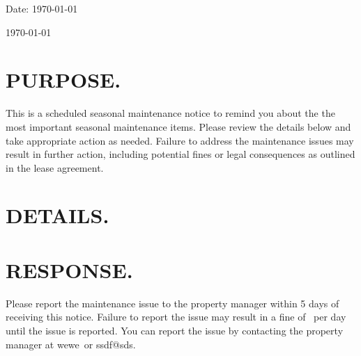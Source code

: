 \documentclass[9pt]{article}
\makeatletter
\renewcommand{\ManagerPhone}{wewe}  %
\renewcommand{\ManagerEmail}{ssdf@sds}  %
\makeatother
\begin{document}
	\ComputePreLeaseDays %

    Date: \today

	\begin{center}
		\centering {}
	\end{center}
	\hfill \today

	\vspace{0.5cm}
	\noticeinfo{}{}

	\section{PURPOSE.}
    This is a scheduled seasonal maintenance notice to remind you about the the most important seasonal maintenance items. Please review the details below and take appropriate action as needed.
    Failure to address the maintenance issues may result in further action, including potential fines or legal consequences as outlined in the lease agreement.

    \section{DETAILS.}
    





    \section{RESPONSE.}
    Please report the maintenance issue to the property manager within 5 days of receiving this notice. Failure to report the issue may result in a fine of \PenaltyFine~per day until the issue is reported. You can report the issue by contacting the property manager at \ManagerPhone~or \ManagerEmail.


	
\end{document}
